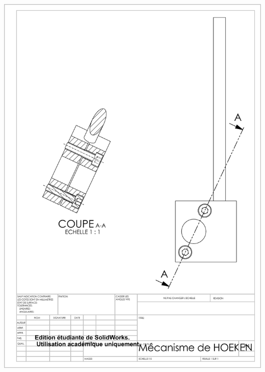{\vspace{-0.5cm}\begin{center}\includegraphics[width=0.9\linewidth]{img/Mecanisme_corrige}\end{center}\vspace{-0.5cm}}



